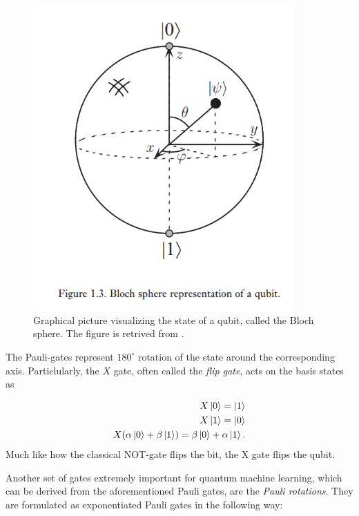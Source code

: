 \begin{figure}[htp]
    \centering
    \includegraphics[width=10cm]{latex/figures/Blochsphere.PNG}
    \caption{Graphical picture visualizing the state of a qubit, called the Bloch sphere. The figure is retrived from \cite{NielsenQuantum}.}
    \label{fig:blochsphere}
\end{figure}

The Pauli-gates represent $180^{\circ}$ rotation of the state around the corresponding axis. Particlularly, the $X$ gate, often called the \emph{flip gate}, acts on the basis states as

\begin{equation}
\begin{aligned}
    X\ket{0} = \ket{1} \\
    X\ket{1} = \ket{0} \\
    X(\alpha \ket{0} + \beta\ket{1}) = \beta \ket{0} + \alpha\ket{1}.
\end{aligned}    
\end{equation}
Much like how the classical NOT-gate flips the bit, the X gate flips the qubit.

Another set of gates extremely important for quantum machine learning, which can be derived from the aforementioned Pauli gates, are the \emph{Pauli rotations}. They are formulated as exponentiated Pauli gates in the following way:

